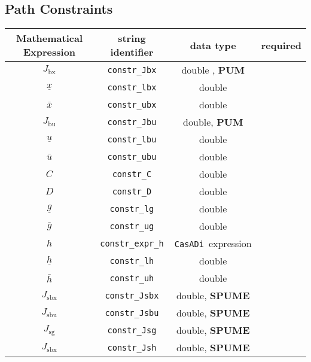 \documentclass{article}
\newcommand{\code}[1]{\texttt{#1}}
\newcommand{\casadi}{\texttt{CasADi}}
\newcommand{\ind}[1]{_{\textrm{#1}}}
\begin{document}
\subsection{Path Constraints}
\begin{table}[h]
	\centering
	\begin{tabular}{|c|c|c|c|}
		\toprule
		Mathematical Expression & string identifier & data type & required \\ \midrule
		$J_{\textrm{bx}}$ & \code{constr\_Jbx}    & double , \textbf{PUM} & \optional  \\
		$\underline{x} $    & \code{constr\_lbx}     & double  & \optional  \\
		$\bar{x} $  & \code{constr\_ubx}     & double  & \optional   \\ \midrule
		$J_{\textrm{bu}}$ & \code{constr\_Jbu}    & double, \textbf{PUM}   & \optional    \\
		$\underline{u} $    & \code{constr\_lbu}     & double   & \optional   \\
		$\bar{u} $         & \code{constr\_ubu}     & double  & \optional   \\ \midrule
		$C$ & \code{constr\_C}    & double  & \optional \\
		$D $    & \code{constr\_D}     & double  & \optional \\
		$\underline{g} $    & \code{constr\_lg}     & double  & \optional    \\
		$\bar{g} $         & \code{constr\_ug}     & double  & \optional   \\ \midrule
		$ h $ & \code{constr\_expr\_h}    & \casadi~expression  & \optional   \\
		$\underline{h} $    & \code{constr\_lh}     & double   & \optional   \\
		$\bar{h} $         & \code{constr\_uh}     & double  & \optional   \\ \midrule
		$ J\ind{sbx} $ & \code{constr\_Jsbx} & double, \textbf{SPUME} & \optional  \\
		$ J\ind{sbu} $ & \code{constr\_Jsbu} & double, \textbf{SPUME}  & \optional \\
		$ J\ind{sg} $ & \code{constr\_Jsg} & double, \textbf{SPUME} & \optional  \\
		$ J\ind{sbx} $ & \code{constr\_Jsh} & double, \textbf{SPUME}  & \optional  \\
		\bottomrule
	\end{tabular}
\end{table}

\newpage
\end{document}
